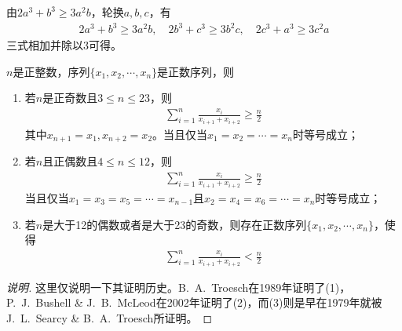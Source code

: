 由$2a^3+b^3\ge3a^2b$，轮换$a,b,c$，有
\begin{align*}
  2a^3+b^3\ge3a^2b,\quad 2b^3+c^3\ge3b^2c,\quad 2c^3+a^3\ge3c^2a
\end{align*}
三式相加并除以3可得。

\begin{theorem}
  $n$是正整数，序列$\{x_1,x_2,\cdots,x_n\}$是正数序列，则
  \begin{enumerate}
  \item 若$n$是正奇数且$3\le n\le 23$，则
    \begin{align*}
      \sum_{i=1}^{n} \frac{x_i}{x_{i+1} + x_{i+2}} \ge \frac{n}{2}  
    \end{align*}
    其中$x_{n+1} = x_1, x_{n+2} = x_2$。当且仅当$x_1=x_2=\cdots=x_n$时等号成立；

  \item 若$n$且正偶数且$4\le n\le 12$，则
    \begin{align*}
      \sum_{i=1}^{n} \frac{x_i}{x_{i+1} + x_{i+2}} \ge \frac{n}{2}  
    \end{align*}
    当且仅当$x_1=x_3=x_5=\cdots=x_{n-1}$且$x_2=x_4=x_6=\cdots=x_n$时等号成立；

  \item 若$n$是大于12的偶数或者是大于23的奇数，则存在正数序列$\{x_1,x_2,\cdots,x_n\}$，使得
    \begin{align*}
      \sum_{i=1}^{n} \frac{x_i}{x_{i+1} + x_{i+2}} < \frac{n}{2}  
    \end{align*}
  \end{enumerate}
\end{theorem}
\begin{proof}[说明]
  这里仅说明一下其证明历史。B.~A.~Troesch在1989年证明了(1)，P.~J.~Bushell \& J.~B.~McLeod在2002年证明了(2)，而(3)则是早在1979年就被 J.~L.~Searcy \& B.~A.~Troesch所证明。
\end{proof}

